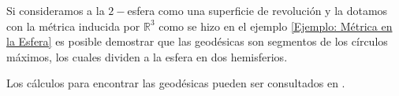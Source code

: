 \begin{example}
  Si consideramos a la $2-$esfera como una superficie de revolución y la dotamos con la métrica inducida por $\mathbb{R}^{3}$ como se hizo en el ejemplo \ref{Ejemplo: Métrica en la Esfera} es posible demostrar que las geodésicas son segmentos de los círculos máximos, los cuales dividen a la esfera en dos hemisferios.

  Los cálculos para encontrar las geodésicas pueden ser consultados en \textcite{delia2011geodesia}.
\end{example}
